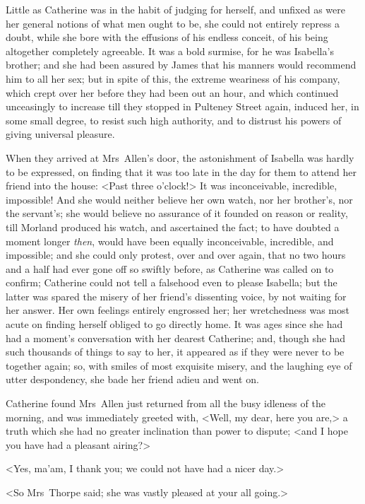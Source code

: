  Little as Catherine was in the habit of judging for herself, and unfixed as were her general notions of what men ought to be, she could not entirely repress a doubt, while she bore with the effusions of his endless conceit, of his being altogether completely agreeable. It was a bold surmise, for he was Isabella's brother; and she had been assured by James that his manners would recommend him to all her sex; but in spite of this, the extreme weariness of his company, which crept over her before they had been out an hour, and which continued unceasingly to increase till they stopped in Pulteney Street again, induced her, in some small degree, to resist such high authority, and to distrust his powers of giving universal pleasure. 

 When they arrived at Mrs~Allen's door, the astonishment of Isabella was hardly to be expressed, on finding that it was too late in the day for them to attend her friend into the house: <Past three o'clock!> It was inconceivable, incredible, impossible! And she would neither believe her own watch, nor her brother's, nor the servant's; she would believe no assurance of it founded on reason or reality, till Morland produced his watch, and ascertained the fact; to have doubted a moment longer \textit{then}, would have been equally inconceivable, incredible, and impossible; and she could only protest, over and over again, that no two hours and a half had ever gone off so swiftly before, as Catherine was called on to confirm; Catherine could not tell a falsehood even to please Isabella; but the latter was spared the misery of her friend's dissenting voice, by not waiting for her answer. Her own feelings entirely engrossed her; her wretchedness was most acute on finding herself obliged to go directly home. It was ages since she had had a moment's conversation with her dearest Catherine; and, though she had such thousands of things to say to her, it appeared as if they were never to be together again; so, with smiles of most exquisite misery, and the laughing eye of utter despondency, she bade her friend adieu and went on. 

 Catherine found Mrs~Allen just returned from all the busy idleness of the morning, and was immediately greeted with, <Well, my dear, here you are,> a truth which she had no greater inclination than power to dispute; <and I hope you have had a pleasant airing?> 

 <Yes, ma'am, I thank you; we could not have had a nicer day.> 

 <So Mrs~Thorpe said; she was vastly pleased at your all going.> 

